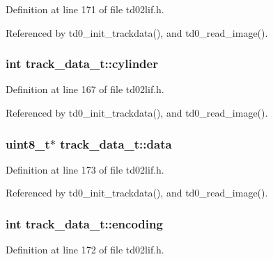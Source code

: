 Definition at line 171 of file td02lif.\+h.



Referenced by td0\+\_\+init\+\_\+trackdata(), and td0\+\_\+read\+\_\+image().

\subsubsection[{\texorpdfstring{cylinder}{cylinder}}]{\setlength{\rightskip}{0pt plus 5cm}int track\+\_\+data\+\_\+t\+::cylinder}\hypertarget{structtrack__data__t_a6639e83e4f30ca47f8501dfc570af1f0}{}\label{structtrack__data__t_a6639e83e4f30ca47f8501dfc570af1f0}


Definition at line 167 of file td02lif.\+h.



Referenced by td0\+\_\+init\+\_\+trackdata(), and td0\+\_\+read\+\_\+image().

\subsubsection[{\texorpdfstring{data}{data}}]{\setlength{\rightskip}{0pt plus 5cm}uint8\+\_\+t$\ast$ track\+\_\+data\+\_\+t\+::data}\hypertarget{structtrack__data__t_a77837d0b564b8ee8e05b7be88753fd15}{}\label{structtrack__data__t_a77837d0b564b8ee8e05b7be88753fd15}


Definition at line 173 of file td02lif.\+h.



Referenced by td0\+\_\+init\+\_\+trackdata(), and td0\+\_\+read\+\_\+image().

\subsubsection[{\texorpdfstring{encoding}{encoding}}]{\setlength{\rightskip}{0pt plus 5cm}int track\+\_\+data\+\_\+t\+::encoding}\hypertarget{structtrack__data__t_ab81a3c49248eaaf3f92d43d1ebd8a329}{}\label{structtrack__data__t_ab81a3c49248eaaf3f92d43d1ebd8a329}


Definition at line 172 of file td02lif.\+h.




